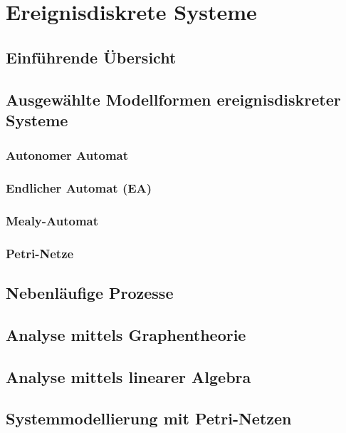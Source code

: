 \section{Ereignisdiskrete Systeme}


\subsection{Einführende Übersicht}


\subsection{Ausgewählte Modellformen ereignisdiskreter Systeme}


\subsubsection{Autonomer Automat}


\subsubsection{Endlicher Automat (EA)}


\subsubsection{Mealy-Automat}


\subsubsection{Petri-Netze}


\subsection{Nebenläufige Prozesse}


\subsection{Analyse mittels Graphentheorie}


\subsection{Analyse mittels linearer Algebra}


\subsection{Systemmodellierung mit Petri-Netzen}

